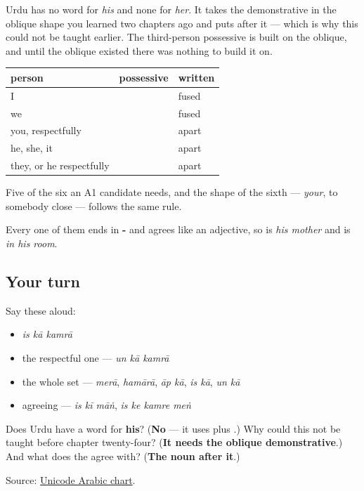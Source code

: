 Urdu has no word for \emph{his} and none for \emph{her}. It takes the demonstrative in the oblique shape you learned two chapters ago and puts \textbf{} after it — which is why this could not be taught earlier. The third-person possessive is built on the oblique, and until the oblique existed there was nothing to build it on.

\begin{grammarlens}[title={Grammar Lens: the column, finally full}]
\noindent
\begin{tabularx}{\linewidth}{@{}>{\raggedright\arraybackslash}X>{\raggedright\arraybackslash}X>{\raggedright\arraybackslash}X@{}}
\toprule
\textbf{person} & \textbf{possessive} & \textbf{written} \\
\midrule
I & \textbf{\ur{میرا}} & fused \\
we & \textbf{\ur{ہمارا}} & fused \\
you, respectfully & \textbf{\ur{آپ} \ur{کا}} & apart \\
he, she, it & \textbf{\ur{اس} \ur{کا}} & apart \\
they, or he respectfully & \textbf{\ur{ان} \ur{کا}} & apart \\
\bottomrule
\end{tabularx}

Five of the six an A1 candidate needs, and the shape of the sixth — \emph{your}, to somebody close — follows the same rule.

Every one of them ends in \textbf{-} and agrees like an adjective, so \textbf{  } is \emph{his mother} and \textbf{   } is \emph{in his room}.
\end{grammarlens}

\subsection*{Your turn}
Say these aloud:

\begin{itemize}
\raggedright
  \item \emph{is kā kamrā}
  \item the respectful one — \emph{un kā kamrā}
  \item the whole set — \emph{merā}, \emph{hamārā}, \emph{āp kā}, \emph{is kā}, \emph{un kā}
  \item agreeing — \emph{is kī māṅ}, \emph{is ke kamre meṅ}
\end{itemize}

\begin{tcolorbox}[breakable,colback=teal!4,colframe=teal!35!black,title={Before you move on}]
Does Urdu have a word for \textbf{his}? (\textbf{No} — it uses \textbf{} plus \textbf{}.) Why could this not be taught before chapter twenty-four? (\textbf{It needs the oblique demonstrative}.) And what does the \textbf{} agree with? (\textbf{The noun after it}.)

Source: \href{https://www.unicode.org/charts/PDF/U0600.pdf}{Unicode Arabic chart}.
\end{tcolorbox}
